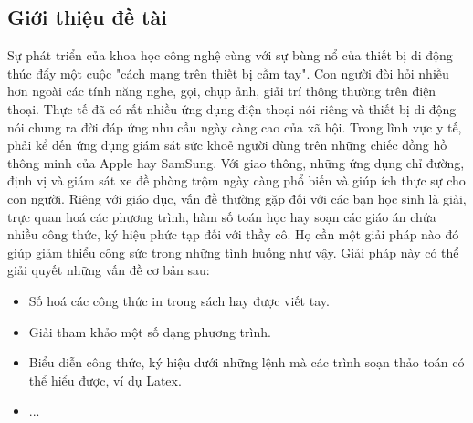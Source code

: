 \documentclass[a4paper,12pt]{article}
\begin{document}
	\subsection{Giới thiệu đề tài}
	\label{subsec: introduce}
	Sự phát triển của khoa học công nghệ cùng với sự bùng nổ của thiết bị di động thúc đẩy một cuộc "cách mạng trên thiết bị cầm tay". Con người đòi hỏi nhiều hơn ngoài các tính năng nghe, gọi, chụp ảnh, giải trí thông thường trên điện thoại. Thực tế đã có rất nhiều ứng dụng điện thoại nói riêng và thiết bị di động nói chung ra đời đáp ứng nhu cầu ngày càng cao của xã hội. Trong lĩnh vực y tế, phải kể đến ứng dụng giám sát sức khoẻ người dùng trên những chiếc đồng hồ thông minh của Apple hay SamSung. Với giao thông, những ứng dụng chỉ đường, định vị và giám sát xe đề phòng trộm ngày càng phổ biến và giúp ích thực sự cho con người. Riêng với giáo dục, vấn đề thường gặp đối với các bạn học sinh là giải, trực quan hoá các phương trình, hàm số toán học hay soạn các giáo án chứa nhiều công thức, ký hiệu phức tạp đối với thầy cô. Họ cần một giải pháp nào đó giúp giảm thiểu công sức trong những tình huống như vậy. Giải pháp này có thể giải quyết những vấn đề cơ bản sau:\\
	\begin{itemize}
		\item Số hoá các công thức in trong sách hay được viết tay.
		\item Giải tham khảo một số dạng phương trình.
		\item Biểu diễn công thức, ký hiệu dưới những lệnh mà các trình soạn thảo toán có thể hiểu được, ví dụ Latex.
		\item ...
		
	\end{itemize}
	
	
	
	
	
\end{document}
